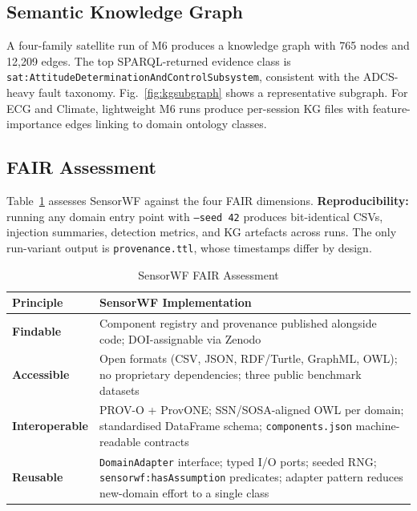 \documentclass[conference]{IEEEtran}
\begin{document}
\subsection{Semantic Knowledge Graph}

A four-family satellite run of M6 produces a knowledge graph with 765 nodes and
12,209 edges. The top SPARQL-returned evidence class is
\texttt{sat:AttitudeDeterminationAndControlSubsystem}, consistent with the
ADCS-heavy fault taxonomy. Fig.~\ref{fig:kgsubgraph} shows a representative
subgraph. For ECG and Climate, lightweight M6 runs produce per-session KG files
with feature-importance edges linking to domain ontology classes.

\subsection{FAIR Assessment}

Table~\ref{tab:fair} assesses SensorWF against the four FAIR dimensions.
\textbf{Reproducibility:} running any domain entry point with \texttt{--seed 42}
produces bit-identical CSVs, injection summaries, detection metrics, and KG
artefacts across runs. The only run-variant output is \texttt{provenance.ttl},
whose timestamps differ by design.

\begin{table}[t]
\caption{SensorWF FAIR Assessment}
\label{tab:fair}
\centering
\scriptsize
\setlength{\tabcolsep}{3pt}
\begin{tabular}{@{}lp{5.2cm}@{}}
\toprule
\textbf{Principle} & \textbf{SensorWF Implementation} \\
\midrule
\textbf{Findable}      & Component registry and provenance published alongside code; DOI-assignable via Zenodo \\
\textbf{Accessible}    & Open formats (CSV, JSON, RDF/Turtle, GraphML, OWL); no proprietary dependencies; three public benchmark datasets \\
\textbf{Interoperable} & PROV-O + ProvONE; SSN/SOSA-aligned OWL per domain; standardised DataFrame schema; \texttt{components.json} machine-readable contracts \\
\textbf{Reusable}      & \texttt{DomainAdapter} interface; typed I/O ports; seeded RNG; \texttt{sensorwf:hasAssumption} predicates; adapter pattern reduces new-domain effort to a single class \\
\bottomrule
\end{tabular}
\end{table}
\end{document}

